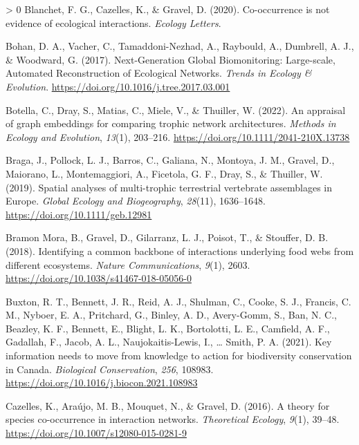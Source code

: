 \documentclass[11pt]{article}
\newlength{\cslhangindent}
\newenvironment{CSLReferences}[3] %
 {%
  \setlength{\parindent}{0pt}
  \ifodd #1 \everypar{\setlength{\hangindent}{\cslhangindent}}\ignorespaces\fi
  \ifnum #2 > 0
  \setlength{\parskip}{#2\baselineskip}
  \fi
 }%
 {}
\begin{document}
\begin{CSLReferences}{1}{0}
\leavevmode\hypertarget{ref-Blanchet2020CooNot}{}%
Blanchet, F. G., Cazelles, K., \& Gravel, D. (2020). Co-occurrence is
not evidence of ecological interactions. \emph{Ecology Letters}.

\leavevmode\hypertarget{ref-Bohan2017NexGlo}{}%
Bohan, D. A., Vacher, C., Tamaddoni-Nezhad, A., Raybould, A., Dumbrell,
A. J., \& Woodward, G. (2017). Next-Generation Global Biomonitoring:
Large-scale, Automated Reconstruction of Ecological Networks.
\emph{Trends in Ecology \& Evolution}.
\url{https://doi.org/10.1016/j.tree.2017.03.001}

\leavevmode\hypertarget{ref-Botella2022AppGra}{}%
Botella, C., Dray, S., Matias, C., Miele, V., \& Thuiller, W. (2022). An
appraisal of graph embeddings for comparing trophic network
architectures. \emph{Methods in Ecology and Evolution}, \emph{13}(1),
203--216. \url{https://doi.org/10.1111/2041-210X.13738}

\leavevmode\hypertarget{ref-Braga2019SpaAna}{}%
Braga, J., Pollock, L. J., Barros, C., Galiana, N., Montoya, J. M.,
Gravel, D., Maiorano, L., Montemaggiori, A., Ficetola, G. F., Dray, S.,
\& Thuiller, W. (2019). Spatial analyses of multi-trophic terrestrial
vertebrate assemblages in Europe. \emph{Global Ecology and
Biogeography}, \emph{28}(11), 1636--1648.
\url{https://doi.org/10.1111/geb.12981}

\leavevmode\hypertarget{ref-BramonMora2018IdeCom}{}%
Bramon Mora, B., Gravel, D., Gilarranz, L. J., Poisot, T., \& Stouffer,
D. B. (2018). Identifying a common backbone of interactions underlying
food webs from different ecosystems. \emph{Nature Communications},
\emph{9}(1), 2603. \url{https://doi.org/10.1038/s41467-018-05056-0}

\leavevmode\hypertarget{ref-Buxton2021KeyInf}{}%
Buxton, R. T., Bennett, J. R., Reid, A. J., Shulman, C., Cooke, S. J.,
Francis, C. M., Nyboer, E. A., Pritchard, G., Binley, A. D., Avery-Gomm,
S., Ban, N. C., Beazley, K. F., Bennett, E., Blight, L. K., Bortolotti,
L. E., Camfield, A. F., Gadallah, F., Jacob, A. L., Naujokaitis-Lewis,
I., \ldots{} Smith, P. A. (2021). Key information needs to move from
knowledge to action for biodiversity conservation in Canada.
\emph{Biological Conservation}, \emph{256}, 108983.
\url{https://doi.org/10.1016/j.biocon.2021.108983}

\leavevmode\hypertarget{ref-Cazelles2016TheSpe}{}%
Cazelles, K., Araújo, M. B., Mouquet, N., \& Gravel, D. (2016). A theory
for species co-occurrence in interaction networks. \emph{Theoretical
Ecology}, \emph{9}(1), 39--48.
\url{https://doi.org/10.1007/s12080-015-0281-9}


\end{CSLReferences}
\end{document}
